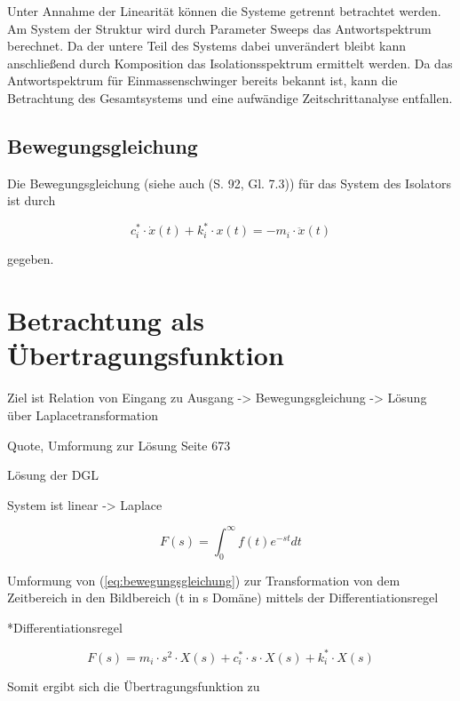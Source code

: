 Unter Annahme der Linearität können die Systeme getrennt betrachtet werden. Am System der Struktur wird durch Parameter Sweeps das Antwortspektrum berechnet. Da der untere Teil des Systems dabei unverändert bleibt kann anschließend durch Komposition das Isolationsspektrum ermittelt werden.
Da das Antwortspektrum für Einmassenschwinger bereits bekannt ist, kann die Betrachtung des Gesamtsystems und eine aufwändige Zeitschrittanalyse entfallen.

\subsection{Bewegungsgleichung}

Die Bewegungsgleichung (siehe auch \cite{Kramer} (S. 92, Gl. 7.3)) für das System des Isolators ist durch

\begin{equation}\label{eq:bewegungsgleichung}
c_i^* \cdot \dot x(t) + k_i^* \cdot x(t) = - m_i \cdot \ddot x(t)
\end{equation}

gegeben.

\pagebreak

\section{Betrachtung als Übertragungsfunktion}
\label{sec:ubertragungsfunktion}

Ziel ist Relation von Eingang zu Ausgang -> Bewegungsgleichung -> Lösung über Laplacetransformation

Quote, Umformung zur Lösung Seite 673

Lösung der DGL

System ist linear -> Laplace 


\begin{equation} \label{laplace}
F(s) = \int_{0}^{\infty} f(t)e^{-st}dt
\end{equation}

Umformung von (\cref{eq:bewegungsgleichung}) zur Transformation von dem Zeitbereich in den Bildbereich (t in s Domäne) mittels der Differentiationsregel

*Differentiationsregel

\begin{equation} \label{laplace1}
F(s) = m_i \cdot s^2 \cdot X(s) + c_i^* \cdot s \cdot X(s) + k_i^* \cdot X(s)
\end{equation}

Somit ergibt sich die Übertragungsfunktion zu

